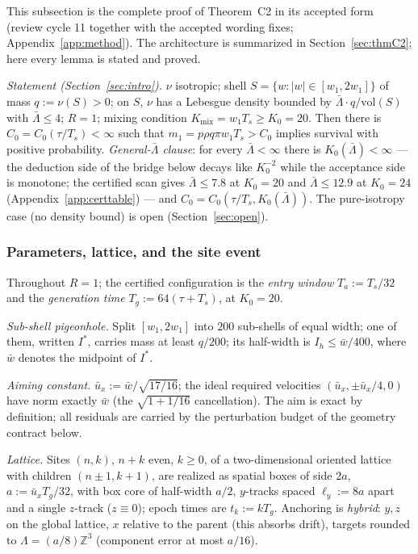 \documentclass[11pt]{article}
\newcommand{\Kmix}{K_{\mathrm{mix}}}
\newcommand{\Ts}{T_s}
\newcommand{\Ta}{T_a}
\newcommand{\Tg}{T_g}
\newcommand{\relL}{\bar\Lambda}
\newcommand{\wbar}{\bar w}
\begin{document}
This subsection is the complete proof of Theorem~C2 in its accepted form
(review cycle 11 together with the accepted wording fixes;
Appendix~\ref{app:method}). The architecture is summarized in
Section~\ref{sec:thmC2}; here every lemma is stated and proved.

\smallskip\noindent\emph{Statement (Section~\ref{sec:intro}).} $\nu$
isotropic; shell $S=\{w:|w|\in[w_1,2w_1]\}$ of mass $q:=\nu(S)>0$; on $S$,
$\nu$ has a Lebesgue density bounded by $\relL\cdot q/\mathrm{vol}(S)$ with
$\relL\le4$; $R=1$; mixing condition $\Kmix=w_1\Ts\ge K_0=20$. Then there
is $C_0=C_0(\tau/\Ts)<\infty$ such that $m_1=p\rho q\pi w_1\Ts>C_0$ implies
survival with positive probability. \emph{General-$\relL$ clause}: for
every $\relL<\infty$ there is $K_0(\relL)<\infty$ --- the deduction side of
the bridge below decays like $K_0^{-2}$ while the acceptance side is
monotone; the certified scan gives $\relL\le7.8$ at $K_0=20$ and
$\relL\le12.9$ at $K_0=24$ (Appendix~\ref{app:certtable}) --- and
$C_0=C_0(\tau/\Ts,K_0(\relL))$. The pure-isotropy case (no density bound)
is open (Section~\ref{sec:open}).

\subsubsection{Parameters, lattice, and the site event}\label{app:c2lattice}

Throughout $R=1$; the certified configuration is the \emph{entry window}
$\Ta:=\Ts/32$ and the \emph{generation time} $\Tg:=64(\tau+\Ts)$, at
$K_0=20$.

\emph{Sub-shell pigeonhole.} Split $[w_1,2w_1]$ into $200$ sub-shells of
equal width; one of them, written $I^*$, carries mass at least $q/200$; its
half-width is $I_h\le\wbar/400$, where $\wbar$ denotes the midpoint of
$I^*$.

\emph{Aiming constant.} $\bar u_x:=\wbar/\sqrt{17/16}$; the ideal required
velocities $(\bar u_x,\pm\bar u_x/4,0)$ have norm exactly $\wbar$ (the
$\sqrt{1+1/16}$ cancellation). The aim is exact by definition; all
residuals are carried by the perturbation budget of the geometry contract
below.

\emph{Lattice.} Sites $(n,k)$, $n+k$ even, $k\ge0$, of a two-dimensional
oriented lattice with children $(n\pm1,k+1)$, are realized as spatial boxes
of side $2a$, $a:=\bar u_x\Tg/32$, with box core of half-width $a/2$,
$y$-tracks spaced $\ell_y:=8a$ apart and a single $z$-track ($z\equiv0$);
epoch times are $t_k:=k\Tg$. Anchoring is \emph{hybrid}: $y,z$ on the
global lattice, $x$ relative to the parent (this absorbs drift), targets
rounded to $\Lambda=(a/8)\mathbb{Z}^3$ (component error at most $a/16$).
\end{document}
